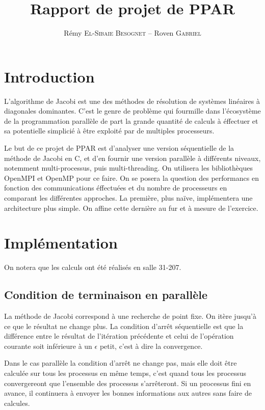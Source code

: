 \documentclass[a4paper]{article}
\title{Rapport de projet de PPAR}
\author{Rémy \textsc{El-Sibaie Besognet} -- Roven \textsc{Gabriel}}
\begin{document}
\maketitle


\section{Introduction}

L'algorithme de Jacobi est une des méthodes de résolution de systèmes
linéaires à diagonales dominantes. C'est le genre de problème qui
fourmille dans l'écosystème de la programmation parallèle de part la
grande quantité de calculs à éffectuer et sa potentielle simplicié à
être exploité par de multiples processeurs.

Le but de ce projet de PPAR est d'analyser une version séquentielle de
la méthode de Jacobi en C, et d'en fournir une version parallèle à
différents niveaux, notemment multi-processus, puis
multi-threading. On utilisera les bibliothèques OpenMPI et OpenMP pour
ce faire. On se posera la question des performancs en fonction des
communications éffectuées et du nombre de processeurs en comparant les
différentes approches. La première, plus naïve, implémentera une
architecture plus simple. On affine cette dernière au fur et à mesure
de l'exercice.

\section{Implémentation} 

On notera que les calculs ont été réalisés en salle 31-207.

\subsection{Condition de terminaison en parallèle}

La méthode de Jacobi correspond à une recherche de point fixe. On
itère jusqu'à ce que le résultat ne change plus. La condition d'arrêt
séquentielle est que la différence entre le résultat de l'itération
précédente et celui de l'opération courante soit inférieure à un
$\epsilon$ petit, c'est à dire la convergence.

Dans le cas parallèle la condition d'arrêt ne change pas, mais elle
doit être calculée sur tous les processus en même temps, c'est quand tous les
processus convergereont que l'ensemble des processus s'arrêteront. Si un
processus fini en avance, il continuera à envoyer les bonnes informations
aux autres sans faire de calcules.
\end{document}
